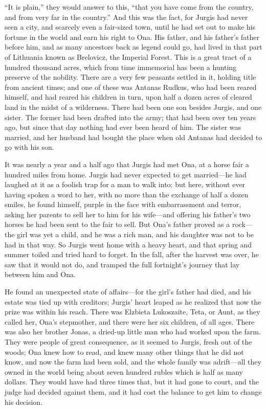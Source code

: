 \documentclass[
]{book}
\theoremstyle{definition}
\theoremstyle{definition}
\theoremstyle{definition}
\theoremstyle{definition}
\theoremstyle{remark}
\begin{document}
``It is plain,'' they would answer to this, ``that you have come from the country, and from very far in the country.'' And this was the fact, for Jurgis had never seen a city, and scarcely even a fair-sized town, until he had set out to make his fortune in the world and earn his right to Ona. His father, and his father's father before him, and as many ancestors back as legend could go, had lived in that part of Lithuania known as Brelovicz, the Imperial Forest. This is a great tract of a hundred thousand acres, which from time immemorial has been a hunting preserve of the nobility. There are a very few peasants settled in it, holding title from ancient times; and one of these was Antanas Rudkus, who had been reared himself, and had reared his children in turn, upon half a dozen acres of cleared land in the midst of a wilderness. There had been one son besides Jurgis, and one sister. The former had been drafted into the army; that had been over ten years ago, but since that day nothing had ever been heard of him. The sister was married, and her husband had bought the place when old Antanas had decided to go with his son.

It was nearly a year and a half ago that Jurgis had met Ona, at a horse fair a hundred miles from home. Jurgis had never expected to get married---he had laughed at it as a foolish trap for a man to walk into; but here, without ever having spoken a word to her, with no more than the exchange of half a dozen smiles, he found himself, purple in the face with embarrassment and terror, asking her parents to sell her to him for his wife---and offering his father's two horses he had been sent to the fair to sell. But Ona's father proved as a rock---the girl was yet a child, and he was a rich man, and his daughter was not to be had in that way. So Jurgis went home with a heavy heart, and that spring and summer toiled and tried hard to forget. In the fall, after the harvest was over, he saw that it would not do, and tramped the full fortnight's journey that lay between him and Ona.

He found an unexpected state of affairs---for the girl's father had died, and his estate was tied up with creditors; Jurgis' heart leaped as he realized that now the prize was within his reach. There was Elzbieta Lukoszaite, Teta, or Aunt, as they called her, Ona's stepmother, and there were her six children, of all ages. There was also her brother Jonas, a dried-up little man who had worked upon the farm. They were people of great consequence, as it seemed to Jurgis, fresh out of the woods; Ona knew how to read, and knew many other things that he did not know, and now the farm had been sold, and the whole family was adrift---all they owned in the world being about seven hundred rubles which is half as many dollars. They would have had three times that, but it had gone to court, and the judge had decided against them, and it had cost the balance to get him to change his decision.
\end{document}
